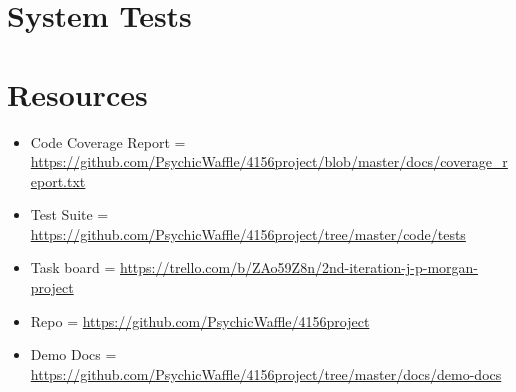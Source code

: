 \documentclass{article}
\begin{document}
\section{System Tests}

\section{Resources}
\begin{itemize}
\item Code Coverage Report = \url{https://github.com/PsychicWaffle/4156project/blob/master/docs/coverage_report.txt}
\item Test Suite = \url{https://github.com/PsychicWaffle/4156project/tree/master/code/tests}
\item Task board = \url{https://trello.com/b/ZAo59Z8n/2nd-iteration-j-p-morgan-project}
\item Repo = \url{https://github.com/PsychicWaffle/4156project}
\item Demo Docs = \url{https://github.com/PsychicWaffle/4156project/tree/master/docs/demo-docs}
\end{itemize}
\end{document}
